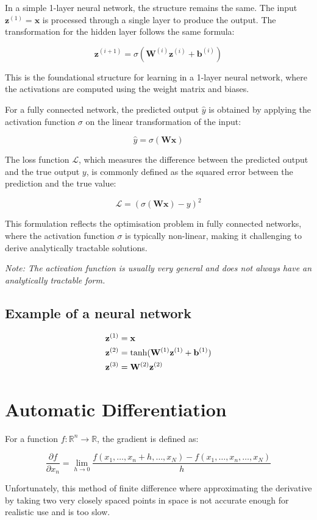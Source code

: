 In a simple 1-layer neural network, the structure remains the same. The input \( \mathbf{z}^{(1)} = \mathbf{x} \) is processed through a single layer to produce the output. The transformation for the hidden layer follows the same formula:

\[
    \mathbf{z}^{(i+1)} = \sigma \left( \mathbf{W}^{(i)} \mathbf{z}^{(i)} + \mathbf{b}^{(i)} \right)
\]

This is the foundational structure for learning in a 1-layer neural network, where the activations are computed using the weight matrix and biases.


For a fully connected network, the predicted output \( \hat{y} \) is obtained by applying the activation function \( \sigma \) on the linear transformation of the input:

\[
    \hat{y} = \sigma(\mathbf{W} \mathbf{x})
\]

The loss function \( \mathcal{L} \), which measures the difference between the predicted output and the true output \( y \), is commonly defined as the squared error between the prediction and the true value:

\[
    \mathcal{L} = \left( \sigma(\mathbf{W} \mathbf{x}) - y \right)^2
\]

This formulation reflects the optimisation problem in fully connected networks, where the activation function \( \sigma \) is typically non-linear, making it challenging to derive analytically tractable solutions.

\textit{Note: The activation function is usually very general and does not always have an analytically tractable form.}



\subsection{Example of a neural network}
\begin{align}
    \mathbf{z}^{(1)} & = \mathbf{x}\\
    \mathbf{z}^{(2)} & = \tanh(\mathbf{W}^{(1)}\mathbf{z}^{(1)} + \mathbf{b}^{(1)})\\
    \mathbf{z}^{(3)} & = \mathbf{W}^{(2)}\mathbf{z}^{(2)} 
\end{align}

\section{Automatic Differentiation}


For a function $f : \mathbb{R}^n \rightarrow \mathbb{R}$, the gradient is defined as:

\begin{equation}
    \frac{\partial f}{\partial x_n} = \lim_{h \rightarrow 0} \frac{f(x_1, \ldots, x_n + h, \ldots, x_N) - f(x_1, \ldots, x_n, \ldots, x_N)}{h}
\end{equation}

Unfortunately, this method of finite difference where approximating the derivative by taking two very closely spaced points in space is not accurate enough for realistic use and is too slow.
